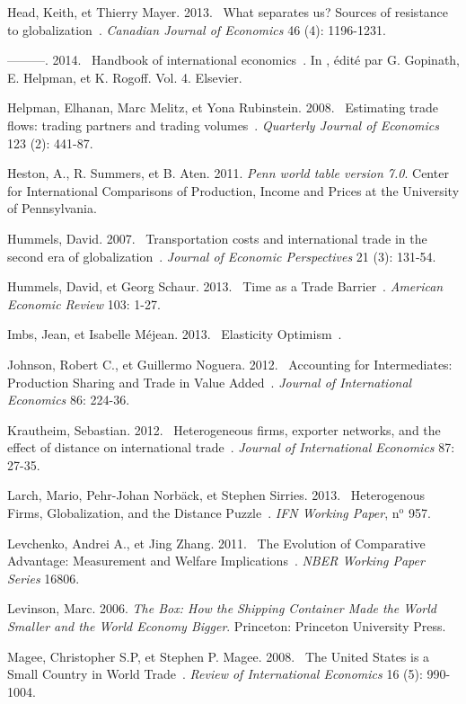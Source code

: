 \documentclass[12pt,twoside,a4paper,notitlepage]{article}
\begin{document}
Head, Keith, et Thierry Mayer. 2013. {\flqq}~What separates us? Sources of resistance to globalization~{\frqq}. \textit{Canadian Journal of Economics} 46 (4): 1196\hbox{-}1231.

---------. 2014. {\flqq}~Handbook of international economics~{\frqq}. In , \'{e}dit\'{e} par G. Gopinath, E. Helpman, et K. Rogoff. Vol. 4. Elsevier.

Helpman, Elhanan, Marc Melitz, et Yona Rubinstein. 2008. {\flqq}~Estimating trade flows: trading partners and trading volumes~{\frqq}. \textit{Quarterly Journal of Economics} 123 (2): 441\hbox{-}87.

Heston, A., R. Summers, et B. Aten. 2011. \textit{Penn world table version 7.0}. Center for International Comparisons of Production, Income and Prices at the University of Pennsylvania.

Hummels, David. 2007. {\flqq}~Transportation costs and international trade in the second era of globalization~{\frqq}. \textit{Journal of Economic Perspectives} 21 (3): 131\hbox{-}54.

Hummels, David, et Georg Schaur. 2013. {\flqq}~Time as a Trade Barrier~{\frqq}. \textit{American Economic Review} 103: 1\hbox{-}27.

Imbs, Jean, et Isabelle M\'{e}jean. 2013. {\flqq}~Elasticity Optimism~{\frqq}.

Johnson, Robert C., et Guillermo Noguera. 2012. {\flqq}~Accounting for Intermediates: Production Sharing and Trade in Value Added~{\frqq}. \textit{Journal of International Economics} 86: 224\hbox{-}36.

Krautheim, Sebastian. 2012. {\flqq}~Heterogeneous firms, exporter networks, and the effect of distance on international trade~{\frqq}. \textit{Journal of International Economics} 87: 27\hbox{-}35.

Larch, Mario, Pehr-Johan Norb\"{a}ck, et Stephen Sirries. 2013. {\flqq}~Heterogenous Firms, Globalization, and the Distance Puzzle~{\frqq}. \textit{IFN Working Paper}, n$^{\mathrm{o}}$ 957.

Levchenko, Andrei A., et Jing Zhang. 2011. {\flqq}~The Evolution of Comparative Advantage: Measurement and Welfare Implications~{\frqq}. \textit{NBER Working Paper Series} 16806.

Levinson, Marc. 2006. \textit{The Box: How the Shipping Container Made the World Smaller and the World Economy Bigger}. Princeton: Princeton University Press.

Magee, Christopher S.P, et Stephen P. Magee. 2008. {\flqq}~The United States is a Small Country in World Trade~{\frqq}. \textit{Review of International Economics} 16 (5): 990\hbox{-}1004.
\end{document}
